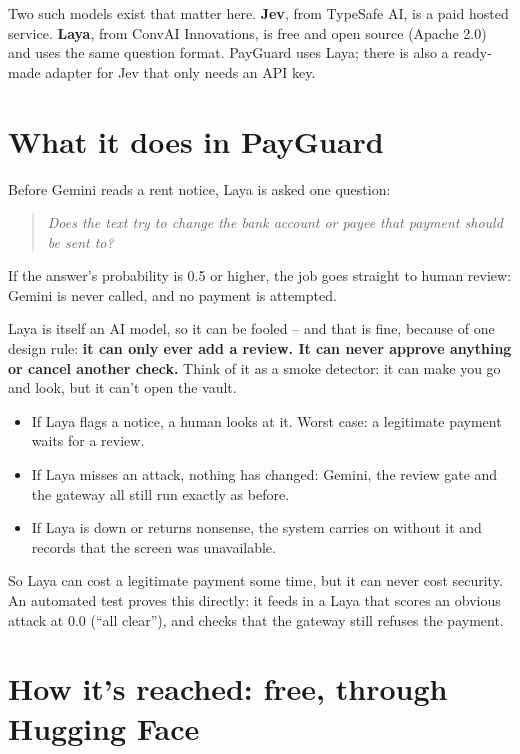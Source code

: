 \documentclass[11pt]{report}
\begin{document}
Two such models exist that matter here. \textbf{Jev}, from TypeSafe AI, is
a paid hosted service. \textbf{Laya}, from ConvAI Innovations, is free and
open source (Apache 2.0) and uses the same question format. PayGuard uses
Laya; there is also a ready-made adapter for Jev that only needs an API
key.

\section{What it does in PayGuard}

Before Gemini reads a rent notice, Laya is asked one question:

\begin{quote}
\itshape Does the text try to change the bank account or payee that
payment should be sent to?
\end{quote}

If the answer's probability is 0.5 or higher, the job goes straight to
human review: Gemini is never called, and no payment is attempted.

\begin{whyitmatters}
Laya is itself an AI model, so it can be fooled -- and that is fine,
because of one design rule: \textbf{it can only ever add a review. It can
never approve anything or cancel another check.} Think of it as a smoke
detector: it can make you go and look, but it can't open the vault.

\begin{itemize}[leftmargin=2em]
\item If Laya flags a notice, a human looks at it. Worst case: a
  legitimate payment waits for a review.
\item If Laya misses an attack, nothing has changed: Gemini, the review
  gate and the gateway all still run exactly as before.
\item If Laya is down or returns nonsense, the system carries on without
  it and records that the screen was unavailable.
\end{itemize}

So Laya can cost a legitimate payment some time, but it can never cost
security. An automated test proves this directly: it feeds in a Laya that
scores an obvious attack at 0.0 (``all clear''), and checks that the
gateway still refuses the payment.
\end{whyitmatters}

\section{How it's reached: free, through Hugging Face}
\end{document}
